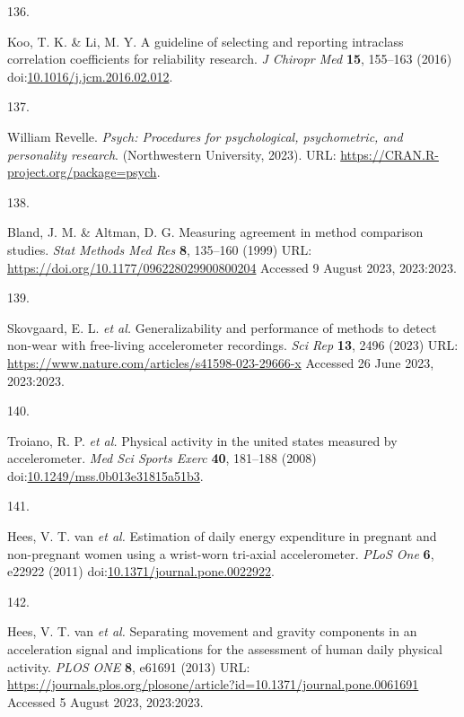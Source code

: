 \documentclass[
  10pt,
]{scrbook}
\newlength{\cslhangindent}
\newlength{\csllabelwidth}
\newlength{\cslentryspacingunit} %
\newenvironment{CSLReferences}[2] %
 {%
  \setlength{\parindent}{0pt}
  \ifodd #1
  \let\oldpar\par
  \def\par{\hangindent=\cslhangindent\oldpar}
  \fi
  \setlength{\parskip}{#2\cslentryspacingunit}
 }%
 {}
\newcommand{\CSLLeftMargin}[1]{\parbox[t]{\csllabelwidth}{#1}}
\newcommand{\CSLRightInline}[1]{\parbox[t]{\linewidth - \csllabelwidth}{#1}\break}
\let\originaltextbf\textbf
\renewcommand{\textbf}[1]{\textcolor{color1}{\textsf{\originaltextbf{#1}}}}
\begin{document}
\begin{CSLReferences}{0}{0}
\leavevmode{}%
\CSLLeftMargin{136. }%
\CSLRightInline{Koo, T. K. \& Li, M. Y. A guideline of selecting and
reporting intraclass correlation coefficients for reliability research.
\emph{J Chiropr Med} \textbf{15}, 155--163 (2016)
doi:\href{https://doi.org/10.1016/j.jcm.2016.02.012}{10.1016/j.jcm.2016.02.012}.}

\leavevmode{}%
\CSLLeftMargin{137. }%
\CSLRightInline{William Revelle. \emph{Psych: Procedures for
psychological, psychometric, and personality research}. (Northwestern
University, 2023). URL: \url{https://CRAN.R-project.org/package=psych}.}

\leavevmode{}%
\CSLLeftMargin{138. }%
\CSLRightInline{Bland, J. M. \& Altman, D. G. Measuring agreement in
method comparison studies. \emph{Stat Methods Med Res} \textbf{8},
135--160 (1999) URL: \url{https://doi.org/10.1177/096228029900800204}
Accessed 9 August 2023, 2023:2023.}

\leavevmode{}%
\CSLLeftMargin{139. }%
\CSLRightInline{Skovgaard, E. L. \emph{et al.} Generalizability and
performance of methods to detect non-wear with free-living accelerometer
recordings. \emph{Sci Rep} \textbf{13}, 2496 (2023) URL:
\url{https://www.nature.com/articles/s41598-023-29666-x} Accessed 26
June 2023, 2023:2023.}

\leavevmode{}%
\CSLLeftMargin{140. }%
\CSLRightInline{Troiano, R. P. \emph{et al.} Physical activity in the
united states measured by accelerometer. \emph{Med Sci Sports Exerc}
\textbf{40}, 181--188 (2008)
doi:\href{https://doi.org/10.1249/mss.0b013e31815a51b3}{10.1249/mss.0b013e31815a51b3}.}

\leavevmode{}%
\CSLLeftMargin{141. }%
\CSLRightInline{Hees, V. T. van \emph{et al.} Estimation of daily energy
expenditure in pregnant and non-pregnant women using a wrist-worn
tri-axial accelerometer. \emph{{PLoS} One} \textbf{6}, e22922 (2011)
doi:\href{https://doi.org/10.1371/journal.pone.0022922}{10.1371/journal.pone.0022922}.}

\leavevmode{}%
\CSLLeftMargin{142. }%
\CSLRightInline{Hees, V. T. van \emph{et al.} Separating movement and
gravity components in an acceleration signal and implications for the
assessment of human daily physical activity. \emph{{PLOS} {ONE}}
\textbf{8}, e61691 (2013) URL:
\url{https://journals.plos.org/plosone/article?id=10.1371/journal.pone.0061691}
Accessed 5 August 2023, 2023:2023.}


\end{CSLReferences}
\end{document}
